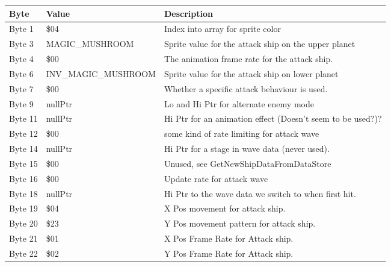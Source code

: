 \begin{figure}[H]
{\begin{adjustbox}{width=12cm}
\begin{tabular}{lll}
\toprule
 Byte    & Value                     & Description                                                        \\
\midrule
 Byte 1  & \$04                       & Index into array for sprite color                                  \\
 Byte 3  & MAGIC\_MUSHROOM            & Sprite value for the attack ship on the upper planet               \\
 Byte 4  & \$00                       & The animation frame rate for the attack ship.                      \\
 Byte 6  & INV\_MAGIC\_MUSHROOM        & Sprite value for the attack ship on lower planet                   \\
 Byte 7  & \$00                       & Whether a specific attack behaviour is used.                       \\
 Byte 9  & nullPtr                   & Lo and Hi Ptr for alternate enemy mode                             \\
 Byte 11 & nullPtr                   & Hi Ptr for an animation effect (Doesn't seem to be used?)?         \\
 Byte 12 & \$00                       & some kind of rate limiting for attack wave                         \\
 Byte 14 & nullPtr                   & Hi Ptr for a stage in wave data (never used).                      \\
 Byte 15 & \$00                       & Unused, see GetNewShipDataFromDataStore                            \\
 Byte 16 & \$00                       & Update rate for attack wave                                        \\
 Byte 18 & nullPtr                   & Hi Ptr to the wave data we switch to when first hit.               \\
 Byte 19 & \$04                       & X Pos movement for attack ship.                                    \\
 Byte 20 & \$23                       & Y Pos movement pattern for attack ship.                            \\
 Byte 21 & \$01                       & X Pos Frame Rate for Attack ship.                                  \\
 Byte 22 & \$02                       & Y Pos Frame Rate for Attack ship.                                  \\

\end{tabular}
\end{adjustbox}}
\end{figure}
